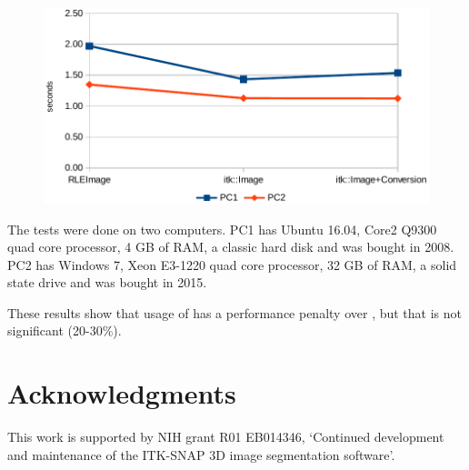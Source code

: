 \documentclass{InsightArticle}
\begin{document}
\begin{figure}[htb]
\center
\includegraphics{Time.pdf}
\label{fig:time}
\end{figure}

The tests were done on two computers.
PC1 has Ubuntu 16.04, Core2 Q9300 quad core processor, 4 GB of RAM,
a classic hard disk and was bought in 2008.
PC2 has Windows 7, Xeon E3-1220 quad core processor, 32 GB of RAM,
a solid state drive and was bought in 2015.

These results show that usage of  has a performance
penalty over , but that is not significant (20-30\%).

\section{Acknowledgments}

This work is supported by NIH grant R01 EB014346,
`Continued development and maintenance of the ITK-SNAP 3D image segmentation software'.



\end{document}
